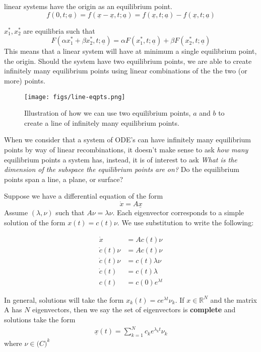 \begin{compactenum}
\item  linear systems have the origin as an equilibrium point.
 $$f(0, t;\underline a) = f(\underline x - \underline x, t; \underline a) = f(\underline x, t; \underline a)-f(\underline x,t;\underline a)$$
\item $x_1^*, x_2^*$ are equilibria such that 
$$F(\alpha x_1^* + \beta x_2^*, t;\underline a) = \alpha F( x_1^*, t; \underline a) + \beta F(x_2^*, t; \underline a)$$
This means that a linear system will have at minimum a single equilibrium point, the origin. Should the system have two equilibrium points, we are able to create infinitely many equilibrium points using linear combinations of the the two (or more) points. 
\begin{figure}
  \centering
  \texttt{[image: figs/line-eqpts.png]}  
  \caption{Illustration of how we can use two equilibrium points, $a$ and $b$ to create a line of infinitely many equilibrium points.}
\end{figure}

When we consider that a system of ODE's can have infinitely many equilibrium points by way of linear recombinations, it doesn't make sense to ask \textit{how many} equilibrium points a system has, instead, it is of interest to ask  \textit{What is the dimension of the subspace the equilibrium points are on?} Do the equilibrium points span a line, a plane, or surface? 
\end{compactenum}

Suppose we have a differential equation of the form 
$$ \dot x = A \underline x$$ 
Assume $(\lambda, \nu)$ such that $A \nu = \lambda \nu$. Each eigenvector corresponds to a simple solution of the form $x(t) = c(t) \nu$. We use substitution to write the following:

\begin{align}
\dot x &= A c(t) \nu \\
\dot c(t) \nu &=  A c(t)  \nu \\
\dot c(t) \nu &=  c(t) \lambda \nu \\
\dot c(t) &=  c(t) \lambda \\
c(t) &=  c(0) e^{\lambda t}
\end{align}

In general, solutions will take the form  $x_k(t) = ce^{\lambda t} \nu_k$. If $x \in \mathbb{R}^N$ and the matrix A has $N$ eigenvectors, then we say the set of eigenvectors is \textbf{complete} and solutions take the form
\begin{align}
     \underline{x}(t) = \sum_{k=1}^{N} c_k e^{\lambda_k t}\nu_k
\end{align}
where $\nu \in \mathbb(C)^k$


